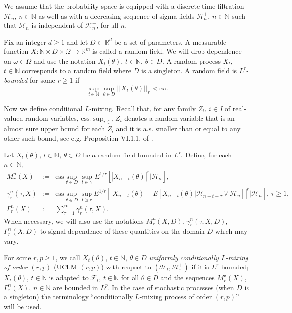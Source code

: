 \documentclass[a4paper,draft]{article}
\begin{document}
We assume that the probability space is equipped
with a discrete-time filtration $\mathcal{H}_n$, $n\in\mathbb{N}$ as well as with a decreasing sequence of sigma-fields $\mathcal{H}_n^+$, $n\in\mathbb{N}$ such that $\mathcal{H}_n$ is
independent of $\mathcal{H}_n^+$, for all $n$.

Fix an integer $d\geq 1$ and let $D\subset \mathbb{R}^d$ be a set of parameters. A measurable function
$X:\mathbb{N}\times D\times\Omega\to\mathbb{R}^m$ is called a random field. We will drop dependence on $\omega\in\Omega$ and
use the notation $X_t(\theta)$, $t\in\mathbb{N}$, $\theta\in D$. A random
process $X_t$, $t\in\mathbb{N}$ corresponds to a random field where $D$
is a singleton. A random field is $L^r$-\emph{bounded} for some $r\geq 1$
if
$$
\sup_{t\in\mathbb{N}}\sup_{\theta\in D} ||X_t(\theta)||_r<\infty.
$$

Now we define conditional $L$-mixing.
Recall that, for any family $Z_i$, $i\in I$ of real-valued random variables, $\mathrm{ess.}\sup_{i\in I} Z_i$
denotes a random variable that is an almost sure upper bound for each $Z_i$ and it is a.s.
smaller than or equal to any other such bound, see e.g. Proposition VI.1.1. of \cite{neveu}.


Let $X_t(\theta)$, $t\in\mathbb{N}$, $\theta\in D$ be a random field
bounded in $L^r$.
Define, for each $n\in\mathbb{N}$,
\begin{eqnarray*}
	M^{n}_r(X) &:=& \mathrm{ess}\sup_{\theta\in D}\sup_{t \in\mathbb{N}}
	E^{1/r}[|X_{n+t}(\theta)|^r\big\vert\mathcal{H}_n],\\
	\gamma^{n}_r(\tau,X)&:=& \mathrm{ess}\sup_{\theta\in D}\sup_{t\geq\tau}
	E^{1/r}[|X_{n+t}(\theta)-E[X_{n+t}(\theta)\vert \mathcal{H}_{n+t-\tau}^+\vee \mathcal{H}_n]|^r\big\vert
	\mathcal{H}_n],\ \tau\geq 1,\\
	\Gamma^{n}_r(X) &:=&\sum_{\tau= 1}^{\infty}\gamma^{n}_r(\tau,X).
\end{eqnarray*}
When necessary, we will also use the notations $M^{n}_r(X,D)$,
$\gamma^{n}_r(\tau,X,D)$, $\Gamma^{n}_r(X,D)$ to signal dependence of
these quantities on the domain $D$ which may vary.

For some $r,p\geq 1$, we call $X_t(\theta)$, $t\in\mathbb{N}$, $\theta\in D$
\emph{uniformly {conditionally} $L$-mixing of order $(r,p)$} (UCLM-$(r,p)$)
with respect to $(\mathcal{H}_t,\mathcal{H}_t^+)$ if
it is $L^r$-bounded; $X_t(\theta)$, $t\in\mathbb{N}$ is adapted to
$\mathcal{F}_t$, $t\in\mathbb{N}$
for all $\theta\in D$
and the sequences  $M^n_r(X)$, $\Gamma^n_r(X)$, $n\in\mathbb{N}$
are bounded in $L^p$. In the case of stochastic processes (when $D$ is a singleton)
the terminology ``conditionally $L$-mixing process of order $(r,p)$'' will be used.
\end{document}
